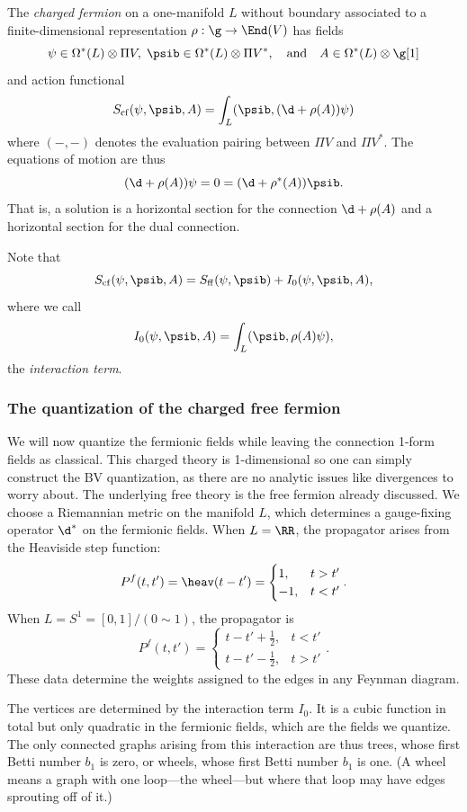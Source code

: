 \documentclass[10pt]{amsart}
\begin{document}
\begin{dfn}
The {\em charged fermion} on a one-manifold $L$ without boundary associated to a finite-dimensional representation $\rho: \g \to \End(V)$ has fields
\[
\psi \in \Omega^*(L) \otimes \Pi V,\; \psib \in \Omega^*(L) \otimes \Pi V^*, \quad\text{and}\quad A \in \Omega^*(L) \otimes \g[1]
\]
and action functional
\[
S_{\rm cf}(\psi,\psib, A) = \int_L (\psib, (\d + \rho(A))\psi) 
\]
where $(-,-)$ denotes the evaluation pairing between $\Pi V$ and $\Pi V^*$.
The equations of motion are thus 
\[
(\d + \rho(A))\psi = 0 = (\d + \rho^*(A))\psib.
\]
That is, a solution is a horizontal section for the connection $\d + \rho(A)$ and a horizontal section for the dual connection.
\end{dfn}

Note that
\[
S_{\rm cf}(\psi,\psib,A) = S_{\rm ff}(\psi,\psib) + I_0(\psi,\psib, A),
\]
where we call  
\[
I_0(\psi,\psib, A) = \int_L (\psib, \rho(A)\psi),
\]
the {\em interaction term}.

\subsubsection{The quantization of the charged free fermion}
\label{sec on quantizing charged FF}

We will now quantize the fermionic fields while leaving the connection 1-form fields as classical.
This charged theory is 1-dimensional so one can simply construct the BV quantization, 
as there are no analytic issues like divergences to worry about.
The underlying free theory is the free fermion already discussed.
We choose a Riemannian metric on the manifold $L$, which determines a gauge-fixing operator $\d^*$ on the fermionic fields.
When $L = \RR$, the propagator arises from the Heaviside step function:
\[
P^f(t,t') = \heav(t-t') = \begin{cases}1, & t > t'\\ -1, & t < t'\end{cases}.
\]
When $L= S^1= [0,1]/(0 \sim 1)$, the propagator is
\[
P^f(t,t') = \begin{cases}t-t'+\frac{1}{2}, & t < t'\\ t-t'-\frac{1}{2}, & t > t'\end{cases}.
\]
These data determine the weights assigned to the edges in any Feynman diagram.

The vertices are determined by the interaction term $I_0$.
It is a cubic function in total but only quadratic in the fermionic fields, which are the fields we quantize.
The only connected graphs arising from this interaction are thus trees,
whose first Betti number $b_1$ is zero, or wheels, whose first Betti number $b_1$ is one.
(A wheel means a graph with one loop---the wheel---but where that loop may have edges sprouting off of it.)
\end{document}
